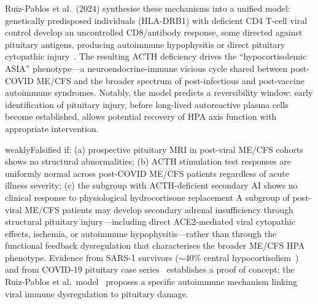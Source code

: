 Ruiz-Pablos et al.\ (2024) synthesise these mechanisms into a unified model: genetically predisposed individuals (HLA-DRB1) with deficient CD4 T-cell viral control develop an uncontrolled CD8/antibody response, some directed against pituitary antigens, producing autoimmune hypophysitis or direct pituitary cytopathic injury~\cite{Ruiz2024hpa}. The resulting ACTH deficiency drives the ``hypocortisolemic ASIA'' phenotype---a neuroendocrine-immune vicious cycle shared between post-COVID ME/CFS and the broader spectrum of post-infectious and post-vaccine autoimmune syndromes. Notably, the model predicts a reversibility window: early identification of pituitary injury, before long-lived autoreactive plasma cells become established, allows potential recovery of HPA axis function with appropriate intervention.

\begin{fhypothesis}{weakly}{Falsified if: (a) prospective pituitary MRI in post-viral ME/CFS cohorts shows no structural abnormalities; (b) ACTH stimulation test responses are uniformly normal across post-COVID ME/CFS patients regardless of acute illness severity; (c) the subgroup with ACTH-deficient secondary AI shows no clinical response to physiological hydrocortisone replacement}
\label{hyp:postviral-pituitary}
A subgroup of post-viral ME/CFS patients may develop secondary adrenal insufficiency through structural pituitary injury---including direct ACE2-mediated viral cytopathic effects, ischemia, or autoimmune hypophysitis---rather than through the functional feedback dysregulation that characterises the broader ME/CFS HPA phenotype. Evidence from SARS-1 survivors ($\sim$40\% central hypocortisolism~\cite{Leow2005sars}) and from COVID-19 pituitary case series~\cite{Carosi2024hypopituitarism} establishes a proof of concept; the Ruiz-Pablos et al.\ model~\cite{Ruiz2024hpa} proposes a specific autoimmune mechanism linking viral immune dysregulation to pituitary damage.


\end{fhypothesis}
